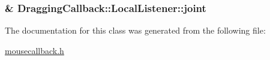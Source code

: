 \subsubsection[{joint}]{\& Dragging\+Callback\+::\+Local\+Listener\+::joint\hspace{0.3cm}{\ttfamily [private]}}\label{classDraggingCallback_1_1LocalListener_a29cf3b0ad072b9ece887f58629cb6b2b}


The documentation for this class was generated from the following file\+:\begin{DoxyCompactItemize}
\item 
\hyperlink{mousecallback_8h}{mousecallback.\+h}\end{DoxyCompactItemize}
